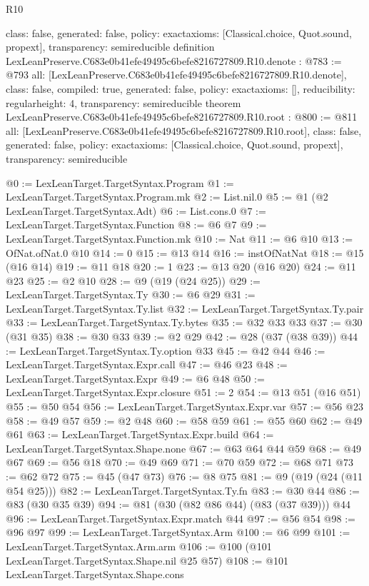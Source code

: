 \begin{lexlean}{R10}
\begin{coremodule}
{  class: false,
  generated: false,
  policy: exact{axioms: [Classical.choice, Quot.sound, propext]},
  transparency: semireducible
}
definition LexLeanPreserve.C683e0b41efe49495c6befe8216727809.R10.denote : @783 := @793 {
  all: [LexLeanPreserve.C683e0b41efe49495c6befe8216727809.R10.denote],
  class: false,
  compiled: true,
  generated: false,
  policy: exact{axioms: []},
  reducibility: regular{height: 4},
  transparency: semireducible
}
theorem LexLeanPreserve.C683e0b41efe49495c6befe8216727809.R10.root : @800 := @811 {
  all: [LexLeanPreserve.C683e0b41efe49495c6befe8216727809.R10.root],
  class: false,
  generated: false,
  policy: exact{axioms: [Classical.choice, Quot.sound, propext]},
  transparency: semireducible
}

@0 := LexLeanTarget.TargetSyntax.Program
@1 := LexLeanTarget.TargetSyntax.Program.mk
@2 := List.nil.{0}
@5 := @1 (@2 LexLeanTarget.TargetSyntax.Adt)
@6 := List.cons.{0}
@7 := LexLeanTarget.TargetSyntax.Function
@8 := @6 @7
@9 := LexLeanTarget.TargetSyntax.Function.mk
@10 := Nat
@11 := @6 @10
@13 := OfNat.ofNat.{0} @10
@14 := 0
@15 := @13 @14
@16 := instOfNatNat
@18 := @15 (@16 @14)
@19 := @11 @18
@20 := 1
@23 := @13 @20 (@16 @20)
@24 := @11 @23
@25 := @2 @10
@28 := @9 (@19 (@24 @25))
@29 := LexLeanTarget.TargetSyntax.Ty
@30 := @6 @29
@31 := LexLeanTarget.TargetSyntax.Ty.list
@32 := LexLeanTarget.TargetSyntax.Ty.pair
@33 := LexLeanTarget.TargetSyntax.Ty.bytes
@35 := @32 @33 @33
@37 := @30 (@31 @35)
@38 := @30 @33
@39 := @2 @29
@42 := @28 (@37 (@38 @39))
@44 := LexLeanTarget.TargetSyntax.Ty.option @33
@45 := @42 @44
@46 := LexLeanTarget.TargetSyntax.Expr.call
@47 := @46 @23
@48 := LexLeanTarget.TargetSyntax.Expr
@49 := @6 @48
@50 := LexLeanTarget.TargetSyntax.Expr.closure
@51 := 2
@54 := @13 @51 (@16 @51)
@55 := @50 @54
@56 := LexLeanTarget.TargetSyntax.Expr.var
@57 := @56 @23
@58 := @49 @57
@59 := @2 @48
@60 := @58 @59
@61 := @55 @60
@62 := @49 @61
@63 := LexLeanTarget.TargetSyntax.Expr.build
@64 := LexLeanTarget.TargetSyntax.Shape.none
@67 := @63 @64 @44 @59
@68 := @49 @67
@69 := @56 @18
@70 := @49 @69
@71 := @70 @59
@72 := @68 @71
@73 := @62 @72
@75 := @45 (@47 @73)
@76 := @8 @75
@81 := @9 (@19 (@24 (@11 @54 @25)))
@82 := LexLeanTarget.TargetSyntax.Ty.fn
@83 := @30 @44
@86 := @83 (@30 @35 @39)
@94 := @81 (@30 (@82 @86 @44) (@83 (@37 @39))) @44
@96 := LexLeanTarget.TargetSyntax.Expr.match @44
@97 := @56 @54
@98 := @96 @97
@99 := LexLeanTarget.TargetSyntax.Arm
@100 := @6 @99
@101 := LexLeanTarget.TargetSyntax.Arm.arm
@106 := @100 (@101 LexLeanTarget.TargetSyntax.Shape.nil @25 @57)
@108 := @101 LexLeanTarget.TargetSyntax.Shape.cons

\end{coremodule}
\end{lexlean}
